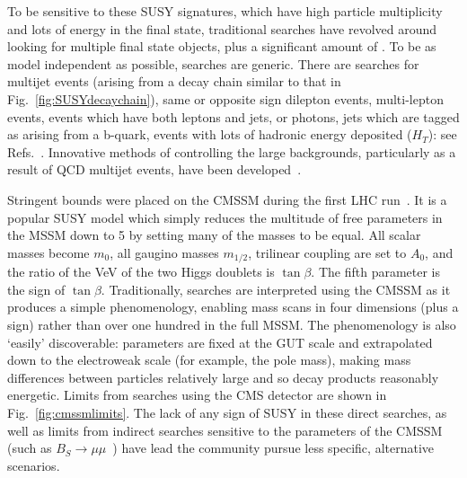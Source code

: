 To be sensitive to these \ac{SUSY} signatures, which have high particle multiplicity and lots of energy in the final state, traditional searches have revolved around looking for multiple final state objects, plus a significant amount of \MET.
To be as model independent as possible, searches are generic.
There are searches for multijet events (arising from a decay chain similar to that in Fig.~\ref{fig:SUSYdecaychain}), 
same or opposite sign dilepton events, multi-lepton events, 
events which have both leptons and jets, or photons,
jets which are tagged as arising from a b-quark, 
events with lots of hadronic energy deposited ($H_{T}$): see Refs.~\cite{CMSdilepbjets,CMSmultijet1,CMSmultijet2,CMSsinlepJets,CMSmultilep,CMSsinglelep,CMSdiphotonH,CMSHZbosons,CMSleptonsWZH}.
Innovative methods of controlling the large backgrounds, particularly as a result of \ac{QCD} multijet events, have been developed~\cite{CMSrazor7TeV,CMSalphaT,CMSmt2}.

Stringent bounds were placed on the \ac{CMSSM} during the first \ac{LHC} run~\cite{constrainedCMSSM,finetuningcmssm}. 
It is a popular \ac{SUSY} model which simply reduces the multitude of free parameters in the \ac{MSSM} down to 5 by setting many of the masses to be equal. 
All scalar masses become $m_{0}$, all gaugino masses $m_{1/2}$, trilinear coupling are set to $A_{0}$, and the ratio of the \ac{VeV} of the two Higgs doublets is $\tan{\beta}$. 
The fifth parameter is the sign of $\tan{\beta}$.
Traditionally, searches are interpreted using the \ac{CMSSM} as it produces a simple phenomenology, enabling mass scans in four dimensions (plus a sign) rather than over one hundred in the full \ac{MSSM}. 
The phenomenology is also `easily' discoverable: parameters are fixed at the \ac{GUT} scale and extrapolated down to the electroweak scale (for example, the \Z pole mass), making mass differences between particles relatively large and so decay products reasonably energetic. 
Limits from searches using the CMS detector are shown in Fig.~\ref{fig:cmssmlimits}.
The lack of any sign of \ac{SUSY} in these direct searches, as well as limits from indirect searches sensitive to the parameters of the \ac{CMSSM} (such as $B_{S}\rightarrow \mu\mu$~\cite{BSmumuCombo}) have lead the community pursue less specific, alternative scenarios.


